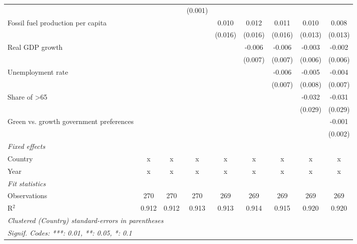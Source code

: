 \begin{table}[htbp]
\begin{tabular}{lcccccccc}
                                              &               &              & (0.001) &         &         &         &         &   \\   
      Fossil fuel production per capita       &               &              &         & 0.010   & 0.012   & 0.011   & 0.010   & 0.008\\   
                                              &               &              &         & (0.016) & (0.016) & (0.016) & (0.013) & (0.013)\\   
      Real GDP growth                         &               &              &         &         & -0.006  & -0.006  & -0.003  & -0.002\\   
                                              &               &              &         &         & (0.007) & (0.007) & (0.006) & (0.006)\\   
      Unemployment rate                       &               &              &         &         &         & -0.006  & -0.005  & -0.004\\   
                                              &               &              &         &         &         & (0.007) & (0.008) & (0.007)\\   
      Share of >65                            &               &              &         &         &         &         & -0.032  & -0.031\\   
                                              &               &              &         &         &         &         & (0.029) & (0.029)\\   
      Green vs. growth government preferences &               &              &         &         &         &         &         & -0.001\\   
                                              &               &              &         &         &         &         &         & (0.002)\\   
      \emph{Fixed effects}\\
      Country                                 & x             & x            & x       & x       & x       & x       & x       & x\\  
      Year                                    & x             & x            & x       & x       & x       & x       & x       & x\\  
      \midrule \emph{Fit statistics}\\
      Observations                            & 270           & 270          & 270     & 269     & 269     & 269     & 269     & 269\\  
      R$^2$                                   & 0.912         & 0.912        & 0.913   & 0.913   & 0.914   & 0.915   & 0.920   & 0.920\\  
      \midrule
      \multicolumn{9}{l}{\emph{Clustered (Country) standard-errors in parentheses}}\\
      \multicolumn{9}{l}{\emph{Signif. Codes: ***: 0.01, **: 0.05, *: 0.1}}\\
   \end{tabular}
\end{table}


